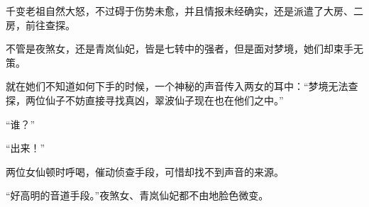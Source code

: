 \begin{this_body}
千变老祖自然大怒，不过碍于伤势未愈，并且情报未经确实，还是派遣了大房、二房，前往查探。

不管是夜煞女，还是青岚仙妃，皆是七转中的强者，但是面对梦境，她们却束手无策。

就在她们不知道如何下手的时候，一个神秘的声音传入两女的耳中：“梦境无法查探，两位仙子不妨直接寻找真凶，翠波仙子现在也在他们之中。”

“谁？”

“出来！”

两位女仙顿时呼喝，催动侦查手段，可惜却找不到声音的来源。

“好高明的音道手段。”夜煞女、青岚仙妃都不由地脸色微变。

\end{this_body}

